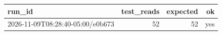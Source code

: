 \begin{tabular}{lrrr}
\toprule
run\_id & test\_reads & expected & ok \\
\midrule
2026-11-09T08:28:40-05:00/e0b673 & 52 & 52 & yes \\
\bottomrule
\end{tabular}
